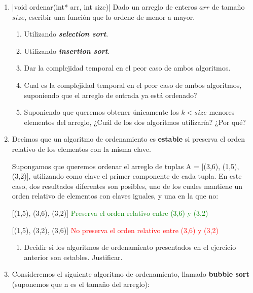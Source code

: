 \documentclass[titlepage,oneside]{book}
\begin{document}
\begin{enumerate}
    \item{}|void ordenar(int* arr, int size)|
    Dado un arreglo de enteros $arr$ de tamaño $size$, escribir una función que lo ordene de menor a mayor.
    \begin{enumerate}
     \item Utilizando \textbf{\textit{selection sort}}.
     \item Utilizando \textbf{\textit{insertion sort}}. 
     \item Dar la complejidad temporal en el peor caso de ambos algoritmos.
     \item Cual es la complejidad temporal en el peor caso de ambos algoritmos, suponiendo que el arreglo de entrada ya está ordenado?
     \item Suponiendo que queremos obtener únicamente los $k < size$ menores elementos del arreglo, ¿Cuál de los dos algoritmos utilizaría? ¿Por qué?
    \end{enumerate}

    \item Decimos que un algoritmo de ordenamiento es \textbf{estable} si preserva el orden relativo de los elementos con la misma clave. \newline
    
    Supongamos que queremos ordenar el arreglo de tuplas A = [(3,6), (1,5), (3,2)], utilizando como clave el primer componente de cada tupla. En este caso, dos resultados diferentes son posibles, uno de los cuales mantiene un orden relativo de elementos con claves iguales, y una en la que no:

    [(1,5), (3,6), (3,2)] \textcolor{green}{Preserva el orden relativo entre (3,6) y (3,2)}

    [(1,5), (3,2), (3,6)] \textcolor{red}{No preserva el orden relativo entre (3,6) y (3,2)}

    \begin{enumerate}
        \item Decidir si los algoritmos de ordenamiento presentados en el ejercicio anterior son estables. Justificar.
    \end{enumerate}

    \item Consideremos el siguiente algoritmo de ordenamiento, llamado \textbf{bubble sort} (suponemos que n es el tamaño del arreglo):


\end{enumerate}
\end{document}
